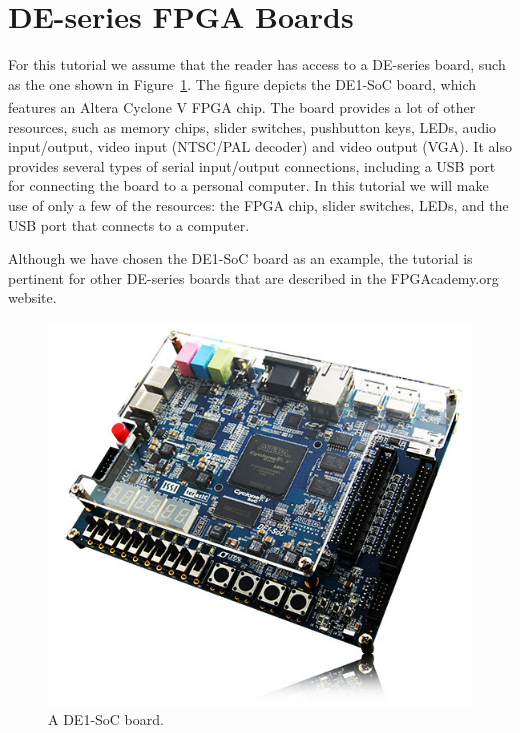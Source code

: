 \documentclass[11pt, twoside, pdftex]{article}
\begin{document}
\section{DE-series FPGA Boards}
For this tutorial we assume that the reader has access to a DE-series board,
such as the one shown in Figure~\ref{fig:1}. The figure depicts the DE1-SoC board, which 
features an Altera Cyclone\textsuperscript{\textregistered} V FPGA chip. The board provides 
a lot of other resources, such as memory chips, slider switches, pushbutton keys, LEDs, 
audio input/output, video input (NTSC/PAL decoder) and video output (VGA).
It also provides several types of serial input/output connections, including a USB port for
connecting the board to a personal computer. In this tutorial we will make use of only a few of 
the resources: the FPGA chip, slider switches, LEDs, and the USB port that connects to a computer.

Although we have chosen the DE1-SoC board as an example, the tutorial is pertinent for other
DE-series boards that are described in the FPGAcademy.org website. 

\begin{figure}[H]
   \begin{center}
      \includegraphics[scale=.5]{figures/figure1.png}
   \end{center}
   \caption{A DE1-SoC board.} 
	\label{fig:1}
\end{figure}
\end{document}
